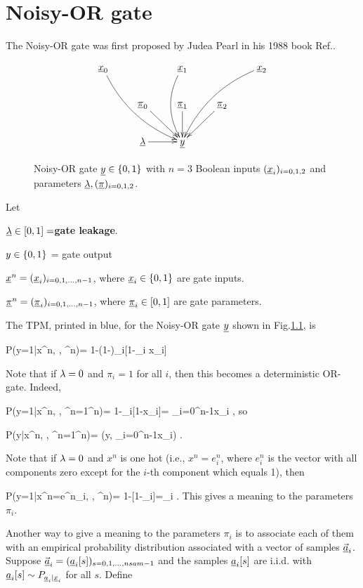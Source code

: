 \chapter{Noisy-OR gate}
The Noisy-OR gate was first
proposed by Judea Pearl in his 1988 book
 Ref.\cite{pearl-1988book}.
\begin{figure}[h!]
$$\xymatrix{
\rvx_0\ar@/_1pc/[ddrr]
&&\rvx_1\ar@/_1pc/[dd]
&&\rvx_2\ar@/_1pc/[ddll]
\\
&\ul{\pi}_0\ar[dr]
&\ul{\pi}_1\ar[d]
&\ul{\pi}_2\ar[dl]
\\
&\ul{\lam}\ar[r]
&\rvy
}$$
\caption{Noisy-OR gate ${\underline{y}}\in\{0,1\}$
with $n=3$ Boolean inputs $({\underline{x}}_i)_{i=0,1,2}$
and parameters 
$\underline{\lambda}, (\underline{\pi})_{i=0,1,2}$.
}
\label{fig-noisy-or-1}
\end{figure}

Let

$\underline{\lambda}\in [0, 1]=${\bf gate leakage}.

$y\in \{0,1\}$ = gate  output

${\underline{x}}^n=({\underline{x}}_i)_{i=0,1, \ldots, n-1}$, where
${\underline{x}}_i\in\{0,1\}$ are
 gate inputs.

$\underline{\pi}^n=(\underline{\pi}_i)_{i=0,1, \ldots, n-1}$, where
$\underline{\pi}_i\in[0,1]$ are
 gate parameters.


The TPM, printed in blue,
 for the Noisy-OR gate ${\underline{y}}$ 
shown in Fig.\ref{fig-noisy-or-1}, is

\beq\color{blue}
P(y=1|x^n, \lam, \pi^n)=
1-(1-\lam)\prod_i[1-\pi_i x_i]
\label{eq-noisy-or-tmp-1}
\eeq

Note
that if $\lambda=0$ and $\pi_i=1$ for all $i$,
then this becomes 
a deterministic OR-gate. Indeed,

\beq
P(y=1|x^n, , \pi^n=1^n)= 1-\prod_i[1-x_i]=
\V_{i=0}^{n-1}x_i
\;,
\eeq
so 

\beq
P(y|x^n, , \pi^n=1^n)=
\delta(y, \V_{i=0}^{n-1}x_i)
\;.
\eeq


Note that if $\lambda=0$ and $x^n$ is one hot (i.e., 
$x^n=e^n_i$, where $e^n_i$
is the vector with all components 
zero except for the $i$-th
component which equals 1), then

\beq
P(y=1|x^n=e^n_i, , \pi^n)=
1-[1-\pi_i]=\pi_i
\;.
\eeq
This gives a meaning to the
parameters $\pi_i$.

Another way to
give a meaning to the 
parameters $\pi_i$
is to associate each of 
them with an
empirical probability 
distribution associated 
with a vector of samples
$\vec{{\underline{a}}}_i$.
Suppose
$\vec{{\underline{a}}}_i=({\underline{a}}_i[s])_
{s=0, 1, \ldots, nsam-1}$ 
and  the samples ${\underline{a}}_i[s]$
 are i.i.d. with
${\underline{a}}_i[s]\sim P_{{\underline{a}}_i|{\underline{x}}_i}$
for all $s$.
Define

